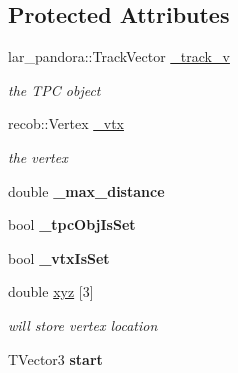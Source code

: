 \subsection*{\-Protected \-Attributes}
\begin{DoxyCompactItemize}
\item 
\hypertarget{classubxsec_1_1ACPTAlgo_a1e0563d86cdf1cc41335a409d0e3a23e}{lar\-\_\-pandora\-::\-Track\-Vector \hyperlink{classubxsec_1_1ACPTAlgo_a1e0563d86cdf1cc41335a409d0e3a23e}{\-\_\-track\-\_\-v}}\label{classubxsec_1_1ACPTAlgo_a1e0563d86cdf1cc41335a409d0e3a23e}

\begin{DoxyCompactList}\small\item\em the \-T\-P\-C object \end{DoxyCompactList}\item 
\hypertarget{classubxsec_1_1ACPTAlgo_a6cafc22e639c105fef51abb5f36ce9b8}{recob\-::\-Vertex \hyperlink{classubxsec_1_1ACPTAlgo_a6cafc22e639c105fef51abb5f36ce9b8}{\-\_\-vtx}}\label{classubxsec_1_1ACPTAlgo_a6cafc22e639c105fef51abb5f36ce9b8}

\begin{DoxyCompactList}\small\item\em the vertex \end{DoxyCompactList}\item 
\hypertarget{classubxsec_1_1ACPTAlgo_a9a5768ec93d755bbf5d301e261266e0d}{double {\bfseries \-\_\-max\-\_\-distance}}\label{classubxsec_1_1ACPTAlgo_a9a5768ec93d755bbf5d301e261266e0d}

\item 
\hypertarget{classubxsec_1_1ACPTAlgo_a71c8e336d951c582195ac97b9038e219}{bool {\bfseries \-\_\-tpc\-Obj\-Is\-Set}}\label{classubxsec_1_1ACPTAlgo_a71c8e336d951c582195ac97b9038e219}

\item 
\hypertarget{classubxsec_1_1ACPTAlgo_a1a7da3296def9462f9a1c6a29046f681}{bool {\bfseries \-\_\-vtx\-Is\-Set}}\label{classubxsec_1_1ACPTAlgo_a1a7da3296def9462f9a1c6a29046f681}

\item 
\hypertarget{classubxsec_1_1ACPTAlgo_aa4d1411847dcdd25774e1d28bb3696bf}{double \hyperlink{classubxsec_1_1ACPTAlgo_aa4d1411847dcdd25774e1d28bb3696bf}{xyz} \mbox{[}3\mbox{]}}\label{classubxsec_1_1ACPTAlgo_aa4d1411847dcdd25774e1d28bb3696bf}

\begin{DoxyCompactList}\small\item\em will store vertex location \end{DoxyCompactList}\item 
\hypertarget{classubxsec_1_1ACPTAlgo_a22dedc31d32d703be93545a8b68fb7c1}{\-T\-Vector3 {\bfseries start}}\label{classubxsec_1_1ACPTAlgo_a22dedc31d32d703be93545a8b68fb7c1}


\end{DoxyCompactItemize}
